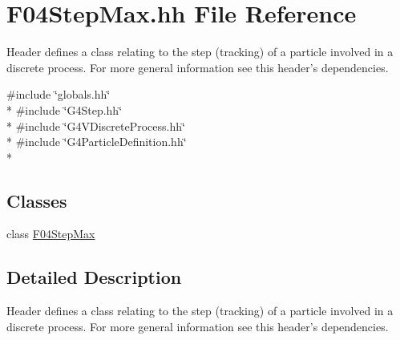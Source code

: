 \hypertarget{F04StepMax_8hh}{\section{F04\-Step\-Max.\-hh File Reference}
\label{F04StepMax_8hh}
}


Header defines a class relating to the step (tracking) of a particle involved in a discrete process. For more general information see this header's dependencies.  


{\ttfamily \#include \char`\"{}globals.\-hh\char`\"{}}\\*
{\ttfamily \#include \char`\"{}G4\-Step.\-hh\char`\"{}}\\*
{\ttfamily \#include \char`\"{}G4\-V\-Discrete\-Process.\-hh\char`\"{}}\\*
{\ttfamily \#include \char`\"{}G4\-Particle\-Definition.\-hh\char`\"{}}\\*
\subsection*{Classes}
\begin{DoxyCompactItemize}
\item 
class \hyperlink{classF04StepMax}{F04\-Step\-Max}
\end{DoxyCompactItemize}


\subsection{Detailed Description}
Header defines a class relating to the step (tracking) of a particle involved in a discrete process. For more general information see this header's dependencies. 